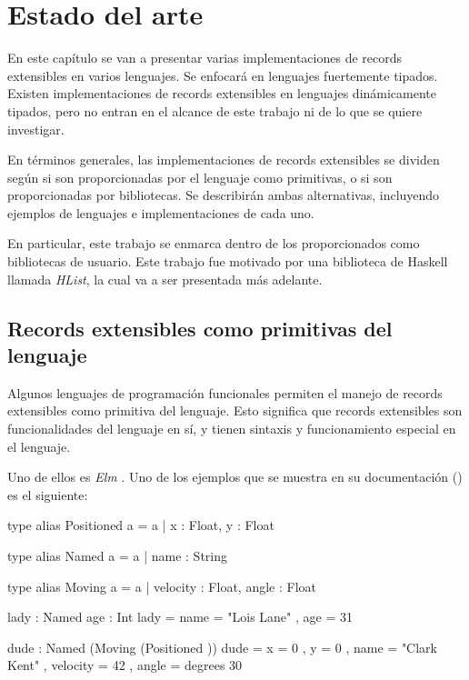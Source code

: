 
\chapter{Estado del arte}
\label{ch:2}
En este capítulo se van a presentar varias implementaciones de records extensibles en varios lenguajes. Se enfocará en lenguajes fuertemente tipados. Existen implementaciones de records extensibles en lenguajes dinámicamente tipados, pero no entran en el alcance de este trabajo ni de lo que se quiere investigar.

En términos generales, las implementaciones de records extensibles se dividen según si son proporcionadas por el lenguaje como primitivas, o si son proporcionadas por bibliotecas. Se describirán ambas alternativas, incluyendo ejemplos de lenguajes e implementaciones de cada uno.

En particular, este trabajo se enmarca dentro de los proporcionados como bibliotecas de usuario. Este trabajo fue motivado por una biblioteca de Haskell llamada \textit{HList}, la cual va a ser presentada más adelante.

\section{Records extensibles como primitivas del lenguaje}

Algunos lenguajes de programación funcionales permiten el manejo de records extensibles como primitiva del lenguaje. Esto significa que records extensibles son funcionalidades del lenguaje en sí, y tienen sintaxis y funcionamiento especial en el lenguaje.

Uno de ellos es \textit{Elm} \cite{Czaplicki:2013:AFR:2499370.2462161}. Uno de los ejemplos que se muestra en su documentación (\cite{ElmRecords}) es el siguiente:

\begin{code}
type alias Positioned a =
  { a | x : Float, y : Float }

type alias Named a =
  { a | name : String }

type alias Moving a =
  { a | velocity : Float, angle : Float }

lady : Named { age : Int }
lady =
  { name = "Lois Lane"
  , age = 31 
  }

dude : Named (Moving (Positioned {}))
dude =
  { x = 0
  , y = 0
  , name = "Clark Kent"
  , velocity = 42
  , angle = degrees 30
  }
\end{code}

